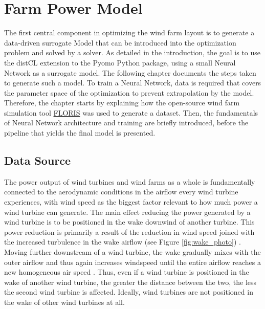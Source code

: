 \chapter{Farm Power Model}\label{chapter:power_model}

The first central component in optimizing the wind farm layout is to generate a data-driven surrogate Model that can be introduced into the optimization problem and solved by a solver. As detailed in the introduction, the goal is to use the distCL extension \cite{alcantara_ruiz_distcl_2022_git} to the Pyomo Python package, using a small Neural Network as a surrogate model. The following chapter documents the steps taken to generate such a model. 
To train a Neural Network, data is required that covers the parameter space of the optimization to prevent extrapolation by the model. Therefore, the chapter starts by explaining how the open-source wind farm simulation tool \href{https://www.nrel.gov/wind/floris.html}{FLORIS} \cite{nrel_floris} was used to generate a dataset. Then, the fundamentals of Neural Network architecture and training are briefly introduced, before the pipeline that yields the final model is presented.

\section{Data Source}

The power output of wind turbines and wind farms as a whole is fundamentally connected to the aerodynamic conditions in the airflow every wind turbine experiences, with wind speed as the biggest factor relevant to how much power a wind turbine can generate. The main effect reducing the power generated by a wind turbine is to be positioned in the wake downwind of another turbine. This power reduction is primarily a result of the reduction in wind speed joined with the increased turbulence in the wake airflow (see Figure \ref{fig:wake_photo})  \cite{KIRANOUDIS1997439}. Moving further downstream of a wind turbine, the wake gradually mixes with the outer airflow and thus again increases windspeed until the entire airflow reaches a new homogeneous air speed \cite{MAGNUSSON1999169}. Thus, even if a wind turbine is positioned in the wake of another wind turbine, the greater the distance between the two, the less the second wind turbine is affected. Ideally, wind turbines are not positioned in the wake of other wind turbines at all. 

